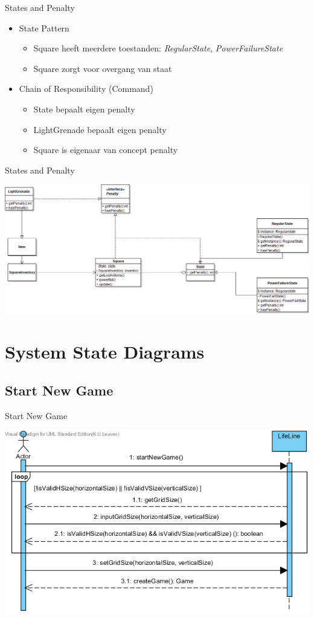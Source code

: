 \documentclass[t]{beamer}
\begin{document}
\begin{frame}{States and Penalty}
\begin{itemize}
	\item State Pattern
	\begin{itemize}
		\item Square heeft meerdere toestanden: \textit{RegularState}, \textit{PowerFailureState}
		\item Square zorgt voor overgang van staat
	\end{itemize}
	\item Chain of Responsibility (Command)
	\begin{itemize}
		\item State bepaalt eigen penalty
		\item LightGrenade bepaalt eigen penalty
		\item Square is eigenaar van concept penalty
	\end{itemize}
\end{itemize}
\end{frame}

\begin{frame}{States and Penalty}
\begin{center}
\includegraphics[width=0.90\linewidth]{images/classDiagramStateAndPanelty}
\end{center}
\end{frame}


\section{System State Diagrams}
\subsection{Start New Game}
\begin{frame}{Start New Game}
\begin{center}
\includegraphics[width=0.90\linewidth]{images/SSDStartNewGame}
\end{center}
\end{frame}
\end{document}
